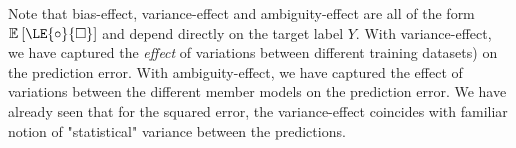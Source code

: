 \documentclass[../main.tex]{subfiles}
\begin{document}



Note that bias-effect, variance-effect and ambiguity-effect are all of the form $\mathbb{E}_{}\left[ \LE{\circ}{\square} \right]$ and depend directly on the target label $Y$. 
With variance-effect, we have captured the \textit{effect} of variations between different training datasets) on the prediction error.
With ambiguity-effect, we have captured the effect of variations between the different member models on the prediction error.
We have already seen that for the squared error, the variance-effect coincides with familiar notion of "statistical" variance between the predictions.
\end{document}
